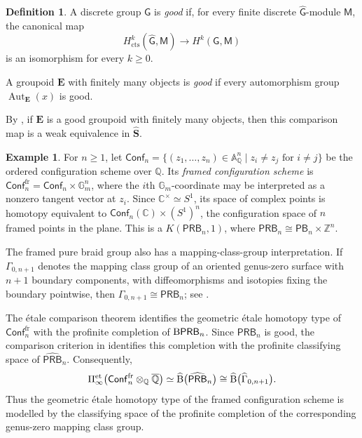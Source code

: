 \documentclass{amsart}
\newcommand{\bE}{\mathbf{E}}
\newcommand{\sSet}{\mathbf{S}}
\newcommand{\Aut}{\operatorname{Aut}}
\newcommand{\cs}{\textnormal{B}}
\newcommand{\PB}{\mathsf{PB}} %
\newcommand{\PRB}{\mathsf{PRB}} %
\newcommand{\Conf}{\mathsf{Conf}}%
\theoremstyle{definition}
\newtheorem{definition}[theorem]{Definition}%
\newtheorem{example}[theorem]{Example}%
\numberwithin{equation}{section}
\begin{document}
\begin{definition}
\label{def: good groupoids}
A discrete group $\mathsf G$ is \emph{good} if, for every finite
discrete $\widehat{\mathsf G}$-module $\mathsf M$, the canonical map
\[
H^k_{\mathrm{cts}}(\widehat{\mathsf G},\mathsf M)
\longrightarrow
H^k(\mathsf G,\mathsf M)
\]
is an isomorphism for every $k\geq0$.

A groupoid $\bE$ with finitely many objects is \emph{good} if every
automorphism group $\Aut_{\bE}(x)$ is good.
\end{definition}

By \cite[Proposition~5.9]{Horel_profinite_groupoids}, if $\bE$ is a
good groupoid with finitely many objects, then this comparison map is
a weak equivalence in $\widehat{\sSet}$.

\begin{example}
\label{example: profinite framed configuration spaces}
For $n\geq1$, let
$\Conf_n=\{(z_1,\ldots,z_n)\in\mathbb A^n_{\mathbb Q}
\mid z_i\neq z_j\text{ for }i\neq j\}$ be the ordered configuration
scheme over $\mathbb Q$. Its \emph{framed configuration scheme} is
$\Conf_n^{\mathrm{fr}}=\Conf_n\times\mathbb G_m^n$, where the
$i$th $\mathbb G_m$-coordinate may be interpreted as a nonzero
tangent vector at $z_i$. Since $\mathbb C^\times\simeq S^1$, its
space of complex points is homotopy equivalent to
$\Conf_n(\mathbb C)\times(S^1)^n$, the configuration space of $n$
framed points in the plane. This is a $K(\PRB_n,1)$, where
$\PRB_n\cong\PB_n\times\mathbb Z^n$.

The framed pure braid group also has a mapping-class-group
interpretation. If $\Gamma_{0,n+1}$ denotes the mapping class group
of an oriented genus-zero surface with $n+1$ boundary components,
with diffeomorphisms and isotopies fixing the boundary pointwise,
then $\Gamma_{0,n+1}\cong\PRB_n$; see
\cite[Chapter~1]{Wahl_Thesis}.

The étale comparison theorem
\cite{Artin_Mazur,Friedlander} identifies the geometric étale
homotopy type of $\Conf_n^{\mathrm{fr}}$ with the profinite
completion of $\cs\PRB_n$. Since $\PRB_n$ is good, the comparison
criterion in
\cite[Proposition~5.9]{Horel_profinite_groupoids} identifies this
completion with the profinite classifying space of
$\widehat{\PRB}_n$. Consequently,
\[
\Pi_\infty^{\mathrm{et}}
\bigl(\Conf_n^{\mathrm{fr}}
\otimes_{\mathbb Q}\overline{\mathbb Q}\bigr)
\simeq
\widehat{\cs}\bigl(\widehat{\PRB}_n\bigr)
\cong
\widehat{\cs}\bigl(\widehat{\Gamma}_{0,n+1}\bigr).
\]
Thus the geometric étale homotopy type of the framed configuration
scheme is modelled by the classifying space of the profinite
completion of the corresponding genus-zero mapping class group.
\end{example}
\end{document}
